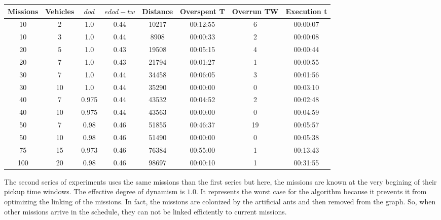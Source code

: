 \documentclass[a4paper,12pt]{article}
\begin{document}
  \small
  \begin{center}
    \begin{tabular}{|c|c|c|c|c|c|c|c|} 
    \hline
    \bf{Missions} & \bf{Vehicles} & \bf{$dod$} & \bf{$edod-tw$} & \bf{Distance} & \bf{Overspent T} & \bf{Overrun TW} &  \bf{Execution t} \\ \hline
    10	 & 2 	& 1.0	& 0.44	& 10217	& 00:12:55	& 6	& 00:00:07\\
    10	 & 3 	& 1.0	& 0.44	& 8908	& 00:00:33	& 2	& 00:00:08\\
    20	 & 5 	& 1.0	& 0.43	& 19508	& 00:05:15	& 4	& 00:00:44\\
    20	 & 7 	& 1.0	& 0.43	& 21794	& 00:01:27	& 1	& 00:00:55\\
    30	 & 7 	& 1.0	& 0.44	& 34458	& 00:06:05	& 3	& 00:01:56\\
    30	 & 10 	& 1.0	& 0.44	& 35290	& 00:00:00	& 0	& 00:03:10\\
    40	 & 7 	& 0.975	& 0.44	& 43532	& 00:04:52	& 2	& 00:02:48\\
    40	 & 10 	& 0.975	& 0.44	& 43563	& 00:00:00	& 0	& 00:04:59\\
    50	 & 7 	& 0.98	& 0.46	& 51855	& 00:46:37	& 19	& 00:05:57\\
    50	 & 10 	& 0.98	& 0.46	& 51490	& 00:00:00	& 0	& 00:05:38\\
    75	 & 15 	& 0.973	& 0.46	& 76384	& 00:55:00	& 1	& 00:13:43\\
    100	 & 20 	& 0.98	& 0.46	& 98697	& 00:00:10	& 1	& 00:31:55\\
    \hline
    \end{tabular}
  \end{center}
  \normalsize

  The second series of experiments uses the same missions than the first series but here, the missions are known at the very begining of their pickup time windows. The effective degree of dynamism is $1.0$. It represents the worst case for the algorithm because it prevents it from optimizing the linking of the missions. In fact, the missions are colonized by the artificial ants and then removed from the graph. So, when other missions arrive in the schedule, they can not be linked efficiently to current missions.
\end{document}

